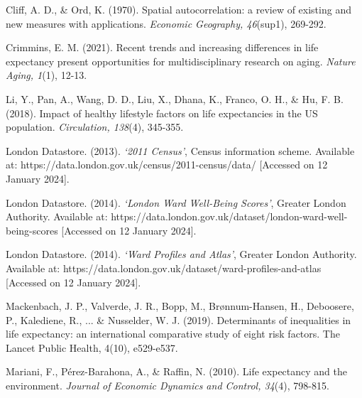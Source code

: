 \documentclass[a4paper,12pt]{article}
\begin{document}
\begin{flushleft}
Cliff, A. D., \& Ord, K. (1970). Spatial autocorrelation: a review of existing and new measures with applications. \textit{Economic Geography, 46}(sup1), 269-292.
\end{flushleft}

\begin{flushleft}
Crimmins, E. M. (2021). Recent trends and increasing differences in life expectancy present opportunities for multidisciplinary research on aging. \textit{Nature Aging, 1}(1), 12-13.
\end{flushleft}

\begin{flushleft}
Li, Y., Pan, A., Wang, D. D., Liu, X., Dhana, K., Franco, O. H., \& Hu, F. B. (2018). Impact of healthy lifestyle factors on life expectancies in the US population. \textit{Circulation, 138}(4), 345-355.
\end{flushleft}

\begin{flushleft}
London Datastore. (2013). \textit{`2011 Census'}, Census information scheme. Available at: https://data.london.gov.uk/census/2011-census/data/ [Accessed on 12 January 2024].
\end{flushleft}

\begin{flushleft}
London Datastore. (2014). \textit{`London Ward Well-Being Scores'}, Greater London Authority. Available at: https://data.london.gov.uk/dataset/london-ward-well-being-scores [Accessed on 12 January 2024].
\end{flushleft}

\begin{flushleft}
London Datastore. (2014). \textit{`Ward Profiles and Atlas'}, Greater London Authority. Available at: https://data.london.gov.uk/dataset/ward-profiles-and-atlas [Accessed on 12 January 2024].
\end{flushleft}

\begin{flushleft}
Mackenbach, J. P., Valverde, J. R., Bopp, M., Brønnum-Hansen, H., Deboosere, P., Kalediene, R., ... \& Nusselder, W. J. (2019). Determinants of inequalities in life expectancy: an international comparative study of eight risk factors. The Lancet Public Health, 4(10), e529-e537.
\end{flushleft}

\begin{flushleft}
Mariani, F., Pérez-Barahona, A., \& Raffin, N. (2010). Life expectancy and the environment. \textit{Journal of Economic Dynamics and Control, 34}(4), 798-815.
\end{flushleft}
\end{document}
